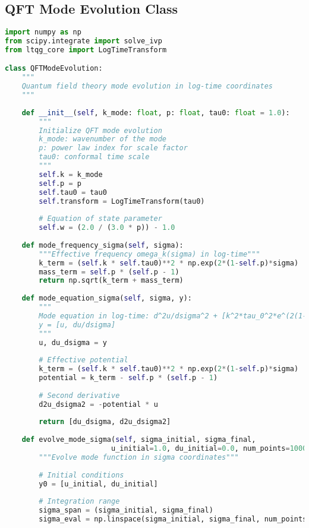 \documentclass[11pt,a4paper]{article}
\begin{document}
\subsection{QFT Mode Evolution Class}

\begin{lstlisting}[language=Python, caption=QFT Mode Evolution in Log-Time]
import numpy as np
from scipy.integrate import solve_ivp
from ltqg_core import LogTimeTransform

class QFTModeEvolution:
    """
    Quantum field theory mode evolution in log-time coordinates
    """
    
    def __init__(self, k_mode: float, p: float, tau0: float = 1.0):
        """
        Initialize QFT mode evolution
        k_mode: wavenumber of the mode
        p: power law index for scale factor
        tau0: conformal time scale
        """
        self.k = k_mode
        self.p = p
        self.tau0 = tau0
        self.transform = LogTimeTransform(tau0)
        
        # Equation of state parameter
        self.w = (2.0 / (3.0 * p)) - 1.0
        
    def mode_frequency_sigma(self, sigma):
        """Effective frequency omega_k(sigma) in log-time"""
        k_term = (self.k * self.tau0)**2 * np.exp(2*(1-self.p)*sigma)
        mass_term = self.p * (self.p - 1)
        return np.sqrt(k_term + mass_term)
    
    def mode_equation_sigma(self, sigma, y):
        """
        Mode equation in log-time: d^2u/dsigma^2 + [k^2*tau_0^2*e^(2(1-p)sigma) - p(p-1)]u = 0
        y = [u, du/dsigma]
        """
        u, du_dsigma = y
        
        # Effective potential
        k_term = (self.k * self.tau0)**2 * np.exp(2*(1-self.p)*sigma)
        potential = k_term - self.p * (self.p - 1)
        
        # Second derivative
        d2u_dsigma2 = -potential * u
        
        return [du_dsigma, d2u_dsigma2]
    
    def evolve_mode_sigma(self, sigma_initial, sigma_final, 
                         u_initial=1.0, du_initial=0.0, num_points=1000):
        """Evolve mode function in sigma coordinates"""
        
        # Initial conditions
        y0 = [u_initial, du_initial]
        
        # Integration range
        sigma_span = (sigma_initial, sigma_final)
        sigma_eval = np.linspace(sigma_initial, sigma_final, num_points)
        

\end{lstlisting}
\end{document}
